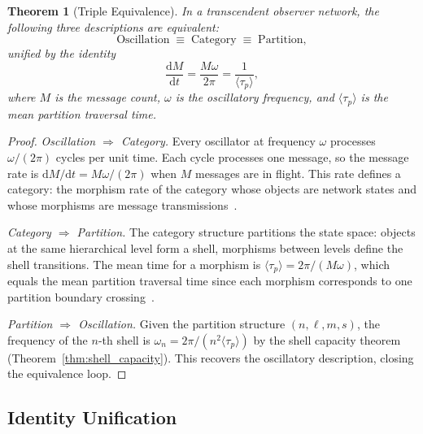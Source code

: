 \documentclass[11pt,twocolumn,a4paper]{article}
\newtheorem{theorem}{Theorem}[section]
\theoremstyle{definition}
\newcommand{\dif}{\mathrm{d}}
\begin{document}
\begin{theorem}[Triple Equivalence]\label{thm:triple_equiv}
In a transcendent observer network, the following three descriptions are equivalent:
\begin{equation}\label{eq:triple_equiv}
  \text{Oscillation} \;\equiv\; \text{Category} \;\equiv\; \text{Partition},
\end{equation}
unified by the identity
\begin{equation}\label{eq:triple_identity}
  \frac{\dif M}{\dif t} = \frac{M\omega}{2\pi} = \frac{1}{\langle \tau_p \rangle},
\end{equation}
where $M$ is the message count, $\omega$ is the oscillatory frequency, and
$\langle \tau_p \rangle$ is the mean partition traversal time.
\end{theorem}

\begin{proof}
\emph{Oscillation $\Rightarrow$ Category.}
Every oscillator at frequency $\omega$ processes $\omega/(2\pi)$ cycles per unit time.
Each cycle processes one message, so the message rate is $\dif M/\dif t = M\omega/(2\pi)$
when $M$ messages are in flight. This rate defines a category: the morphism rate of the
category whose objects are network states and whose morphisms are message
transmissions~\cite{sachikonye2024a}.

\emph{Category $\Rightarrow$ Partition.}
The category structure partitions the state space: objects at the same hierarchical level
form a shell, morphisms between levels define the shell transitions. The mean time for a
morphism is $\langle \tau_p \rangle = 2\pi/(M\omega)$, which equals the mean partition
traversal time since each morphism corresponds to one partition boundary
crossing~\cite{sachikonye2025c}.

\emph{Partition $\Rightarrow$ Oscillation.}
Given the partition structure $(n, \ell, m, s)$, the frequency of the $n$-th shell is
$\omega_n = 2\pi/(n^2 \langle \tau_p \rangle)$ by the shell capacity theorem
(Theorem~\ref{thm:shell_capacity}). This recovers the oscillatory description, closing the
equivalence loop.
\end{proof}

\subsection{Identity Unification}\label{sec:foundations:identity}
\end{document}
